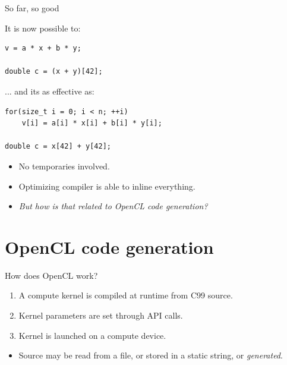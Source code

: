 \documentclass[@BEAMER_OPTIONS@]{beamer}
\newcommand{\CC}{{\rm C99}\xspace}
\begin{document}
\begin{frame}[fragile]{So far, so good}
    \begin{exampleblock}{It is now possible to:}
        \begin{lstlisting}
v = a * x + b * y;

double c = (x + y)[42];
        \end{lstlisting}
    \end{exampleblock}

    \begin{exampleblock}{... and its as effective as:}
        \begin{lstlisting}
for(size_t i = 0; i < n; ++i)
    v[i] = a[i] * x[i] + b[i] * y[i];

double c = x[42] + y[42];
        \end{lstlisting}
    \end{exampleblock}
    \begin{itemize}
        \item No temporaries involved.
        \item Optimizing compiler is able to inline everything.
            \vspace{\baselineskip}
            \pause
        \item<alert@2> \emph{But how is that related to OpenCL code generation?}
    \end{itemize}
\end{frame}


\section{OpenCL code generation}
\begin{frame}
    \sectionpage
\end{frame}

\note{ }

\begin{frame}{How does OpenCL work?}
    \begin{enumerate}
        \item A compute kernel is compiled at runtime from \CC source.
        \item Kernel parameters are set through API calls.
        \item Kernel is launched on a compute device.
    \end{enumerate}
    \vspace{\baselineskip}
    \pause
    \begin{itemize}
        \item Source may be read from a file, or stored in a static
            string, or \alert{\emph{generated}}.
    \end{itemize}
\end{frame}
\end{document}
